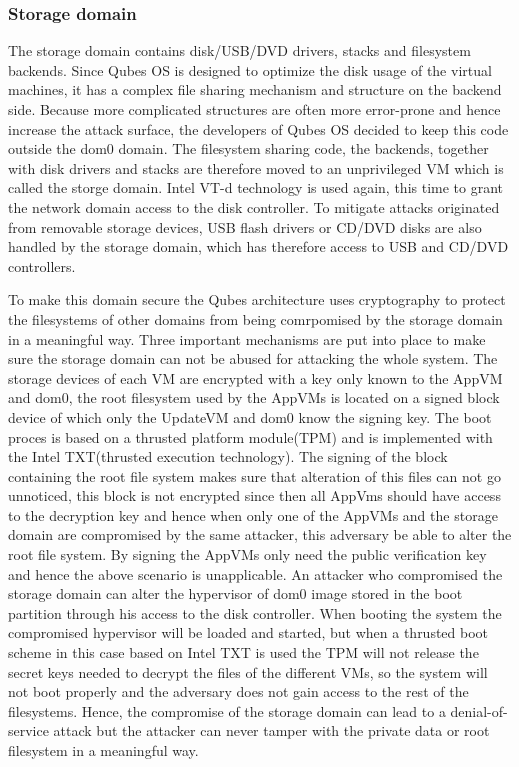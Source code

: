 \documentclass[runningheads,a4paper]{article}
\begin{document}
\subsubsection{Storage domain}

The storage domain contains disk/USB/DVD drivers, stacks and
filesystem backends. Since Qubes OS is designed to optimize the disk
usage of the virtual machines, it has a complex file sharing mechanism
and structure on the backend side. Because more complicated structures
are often more error-prone and hence increase the attack surface, the
developers of Qubes OS decided to keep this code outside the dom0
domain. The filesystem sharing code, the backends, together with disk
drivers and stacks are therefore moved to an unprivileged VM which is
called the storge domain. Intel VT-d technology is used again, this
time to grant the network domain access to the disk controller. To
mitigate attacks originated from removable storage devices, USB flash
drivers or CD/DVD disks are also handled by the storage domain, which
has therefore access to USB and CD/DVD controllers.

To make this domain secure the Qubes architecture uses cryptography to
protect the filesystems of other domains from being comrpomised by the
storage domain in a meaningful way. Three important mechanisms are put
into place to make sure the storage domain can not be abused for
attacking the whole system. The storage devices of each VM are
encrypted with a key only known to the AppVM and dom0, the root
filesystem used by the AppVMs is located on a signed block device of
which only the UpdateVM and dom0 know the signing key. The boot
proces is based on a thrusted platform module(TPM) and is implemented
with the Intel TXT(thrusted execution technology). The signing of the
block containing the root file system makes sure that alteration of
this files can not go unnoticed, this block is not encrypted since
then all AppVms should have access to the decryption key and hence
when only one of the AppVMs and the storage domain are compromised by
the same attacker, this adversary be able to alter the root file
system. By signing the AppVMs only need the public verification key
and hence the above scenario is unapplicable. An attacker who
compromised the storage domain can alter the hypervisor of dom0 image
stored in the boot partition through his access to the disk
controller. When booting the system the compromised hypervisor will be
loaded and started, but when a thrusted boot scheme in this case based
on Intel TXT is used the TPM will not release the secret keys needed
to decrypt the files of the different VMs, so the system will not boot
properly and the adversary does not gain access to the rest of the
filesystems. Hence, the compromise of the storage domain can lead to a
denial-of-service attack but the attacker can never tamper with the
private data or root filesystem in a meaningful way.
\end{document}
